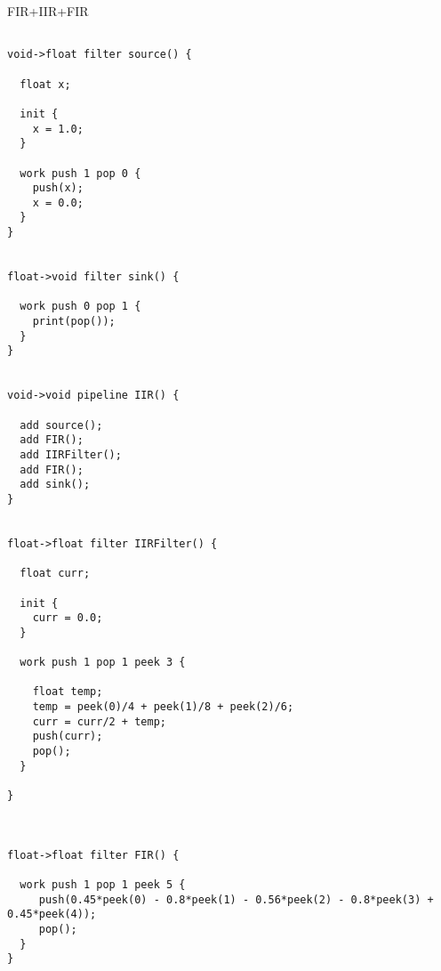 FIR+IIR+FIR
\begin{scriptsize}
\begin{verbatim}

void->float filter source() {

  float x;

  init {
    x = 1.0;
  }

  work push 1 pop 0 {
    push(x);
    x = 0.0;
  }
}


float->void filter sink() {

  work push 0 pop 1 {
    print(pop());
  }
}


void->void pipeline IIR() {

  add source();
  add FIR();
  add IIRFilter();
  add FIR();
  add sink();
}


float->float filter IIRFilter() {

  float curr;

  init {
    curr = 0.0;
  }

  work push 1 pop 1 peek 3 {

    float temp;
    temp = peek(0)/4 + peek(1)/8 + peek(2)/6;
    curr = curr/2 + temp;
    push(curr);
    pop();
  }

}



float->float filter FIR() {

  work push 1 pop 1 peek 5 {
     push(0.45*peek(0) - 0.8*peek(1) - 0.56*peek(2) - 0.8*peek(3) + 0.45*peek(4));
     pop();
  }
}

\end{verbatim}
\end{scriptsize}
